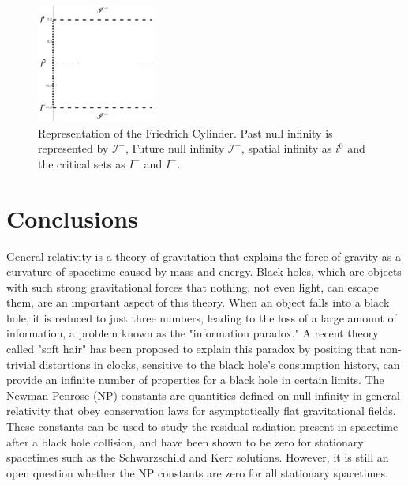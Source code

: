 \begin{figure}[h]
	\centering \includegraphics[width =0.35\textwidth]{friedrich cylinder.pdf}
    \caption{Representation of the Friedrich Cylinder. Past null infinity is represented by
    $\mathscr{I}^{-}$, Future null infinity $\mathscr{I}^{+}$, spatial infinity as $i^{0}$ and the critical sets as $I^{+}$ and $I^{-}$.}
\end{figure}

\section{Conclusions}
\label{sec:conclusions}

General relativity is a theory of gravitation that explains the force of gravity as a curvature of spacetime caused by mass and energy. Black holes, which are objects with such strong gravitational forces that nothing, not even light, can escape them, are an important aspect of this theory. When an object falls into a black hole, it is reduced to just three numbers, leading to the loss of a large amount of information, a problem known as the "information paradox." A recent theory called "soft hair" has been proposed to explain this paradox by positing that non-trivial distortions in clocks, sensitive to the black hole's consumption history, can provide an infinite number of properties for a black hole in certain limits. The Newman-Penrose (NP) constants are quantities defined on null infinity in general relativity that obey conservation laws for asymptotically flat gravitational fields. These constants can be used to study the residual radiation present in spacetime after a black hole collision, and have been shown to be zero for stationary spacetimes such as the Schwarzschild and Kerr solutions. However, it is still an open question whether the NP constants are zero for all stationary spacetimes.

